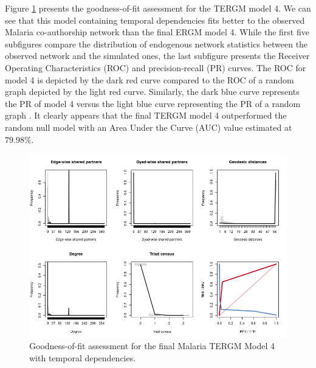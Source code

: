 Figure \ref{fig:malaria_tergm-gof} presents the goodness-of-fit assessment for the TERGM model 4. We can see that this model containing temporal dependencies fits better to the observed Malaria co-authorship network than the final ERGM model 4. While the first five subfigures compare the distribution of endogenous network statistics between the observed network and the simulated ones, the last subfigure presents the Receiver Operating Characteristics (ROC) and precision-recall (PR) curves. The ROC for model 4 is depicted by the dark red curve compared to the ROC of a random graph depicted by the light red curve. Similarly, the dark blue curve represents the PR of model 4 versus the light blue curve representing the PR of a random graph \cite{leifeld_temporal_2015}. It clearly appears that the final TERGM model 4 outperformed the random null model with an Area Under the Curve (AUC) value estimated at $79.98\%$.

\begin{figure}[!h]
\centering
\includegraphics[scale=0.65]{Chapters/malaria/statMod/tergm_gof}
\caption{Goodness-of-fit assessment for the final Malaria TERGM Model 4 with temporal dependencies.}
\label{fig:malaria_tergm-gof}
\end{figure}
